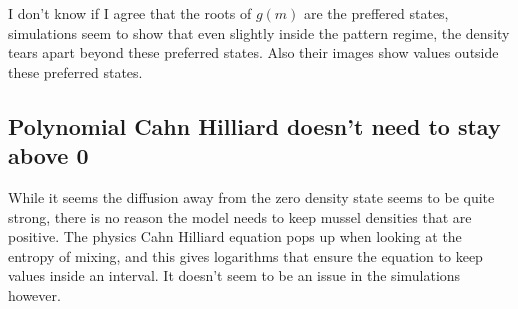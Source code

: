 \documentclass[a4paper]{jpconf}
\begin{document}
I don't know if I agree that the roots of $g(m)$ are the preffered states, simulations seem to show that even slightly inside the pattern regime, the density tears apart beyond these preferred states. Also their images show values outside these preferred states. 
\subsection*{Polynomial Cahn Hilliard doesn't need to stay above 0}
While it seems the diffusion away from the zero density state seems to be quite strong, there is no reason the model needs to keep mussel densities that are positive. The physics Cahn Hilliard equation pops up when looking at the entropy of mixing, and this gives logarithms that ensure the equation to keep values inside an interval. It doesn't seem to be an issue in the simulations however. 
\end{document}
